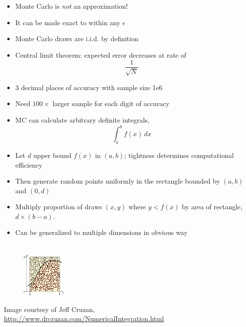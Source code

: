 \documentclass[10pt]{report}
\begin{document}
\begin{itemize}
\item Monte Carlo is \emph{not} an approximation!
\item It can be made exact to within any $\epsilon$
\item Monte Carlo draws are i.i.d. by definition
\item Central limit theorem: expected error decreases at rate of
{\Large
\[
\frac{1}{\sqrt{N}}
\]
}
\item 3 decimal places of accuracy with 
sample size 1e6
\item Need $100 \times$ larger sample for each digit of accuracy
\end{itemize}

\begin{minipage}[t]{0.69\textwidth}
\vspace*{-0.1in}
\small
\begin{itemize}
\item MC can calculate arbitrary definite integrals,
\[
\int_a^b f(x) \, dx
\]
\item Let $d$ upper bound $f(x)$ in $(a,b)$;  tightness determines
computational efficiency
\item Then generate random points uniformly in the rectangle bounded by $(a,b)$ and $(0,d)$
\item Multiply proportion of draws $(x,y)$ where $y < f(x)$ by area of rectangle, $d \times (b-a)$.
\item Can be generalized to multiple dimensions in obvious way
\end{itemize}
\end{minipage}
\begin{minipage}[t]{0.29\textwidth}
\mbox{ } \\
\mbox{ } \ \ \ \ 
\includegraphics[height=0.9in]{img/monte-carlo-integration.png}
\end{minipage}
\vfill
\hfill
{\tiny Image courtesy of Jeff Cruzan, \url{http://www.drcruzan.com/NumericalIntegration.html}}
\end{document}
